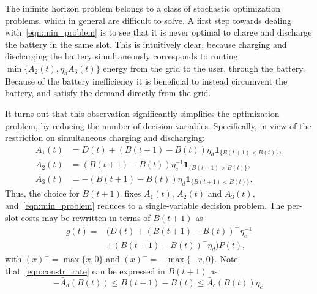 \documentclass[journal]{IEEEtran}
\newcommand{\Amax}{\bar{A}}
\newcommand\1{\mathbf{1}}
\newcommand{\indi}[1]{\1_{\{#1\}}}
\begin{document}
The infinite horizon problem belongs to a class of stochastic optimization problems, which
in general are difficult to solve. A first step towards dealing with~\eqref{eqn:min_problem} is to see that it is never optimal to charge and discharge the battery in the same slot.
This is intuitively clear, because charging and discharging the battery simultaneously corresponds to routing $\min\{A_2(t),\eta_d A_3(t)\}$ energy from the grid to the user, through the battery. Because of the battery inefficiency it is beneficial to instead circumvent the battery, and satisfy the demand directly from the grid.

It turns out that this observation significantly simplifies the optimization problem, by reducing the number of decision variables.
Specifically, in view of the restriction on simultaneous charging and discharging:
\begin{align*}
A_1(t) &= D(t) + (B(t+1) - B(t)) \eta_d \indi{B(t+1) < B(t)},\\
A_2(t) &= (B(t+1) - B(t)) \eta_c^{-1} \indi{B(t+1) > B(t)},\\
A_3(t) &= -(B(t+1) - B(t)) \eta_d \indi{B(t+1) < B(t)}.
\end{align*}
Thus, the choice for $B(t+1)$ fixes $A_1(t)$, $A_2(t)$ and $A_3(t)$, and~\eqref{eqn:min_problem} reduces to a single-variable decision problem. The per-slot costs may be rewritten in terms of $B(t+1)$ as
\begin{align*}
g(t) ={}& (D(t) + (B(t+1) - B(t))^+ \eta_c^{-1}\\
& + (B(t+1) - B(t))^- \eta_d) P(t),
\end{align*}
with $(x)^+ = \max\{x,0\}$ and $(x)^- = -\max\{-x,0\}$. Note that~\eqref{eqn:constr_rate} can be expressed in $B(t+1)$ as
\begin{equation*}
-\Amax_d(B(t)) \le B(t+1) - B(t) \le \bar{A}_c(B(t)) \eta_c.
\end{equation*}
\end{document}
